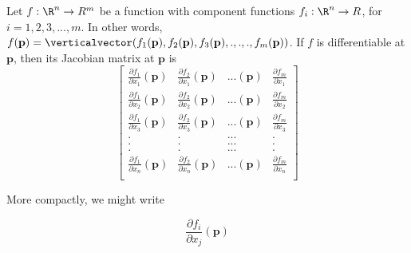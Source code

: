 \documentclass{ximera}
\begin{document}
	\begin{theorem}
		Let $f:\R^n \to R^m$ be a function with component functions $f_i:\R^n \to R$, for $i=1,2,3,...,m$.  In other words,
		$f(\mathbf{p}) = \verticalvector(f_1(\mathbf{p}),f_2(\mathbf{p}),f_3(\mathbf{p}),.,.,., f_m(\mathbf{p}))$.  If $f$ is differentiable at $\mathbf{p}$,
		 then its Jacobian matrix at $\mathbf{p}$ is 
		  \[
		  \begin{bmatrix}
		  \frac{\partial f_1}{\partial x_1} \left(\mathbf{p}\right) & \frac{\partial f_2}{\partial x_1} \left(\mathbf{p}\right) & ...\left(\mathbf{p}\right) & \frac{\partial f_m}{\partial x_1} \\
		  \frac{\partial f_1}{\partial x_2} \left(\mathbf{p}\right) & \frac{\partial f_2}{\partial x_2} \left(\mathbf{p}\right) & ...\left(\mathbf{p}\right) & \frac{\partial f_m}{\partial x_2} \\
		  \frac{\partial f_1}{\partial x_3} \left(\mathbf{p}\right) & \frac{\partial f_2}{\partial x_3} \left(\mathbf{p}\right) & ...\left(\mathbf{p}\right) & \frac{\partial f_m}{\partial x_3} \\
		    .&.&...&.\\
		    .&.&...&.\\
		    .&.&...&.\\
		 \frac{\partial f_1}{\partial x_n} \left(\mathbf{p}\right) & \frac{\partial f_2}{\partial x_n} \left(\mathbf{p}\right) & ...\left(\mathbf{p}\right) & \frac{\partial f_m}{\partial x_n} \\
		  \end{bmatrix}
		  \]
		  
		  More compactly, we might write
		  
		  \[
		  	\frac{\partial f_i}{\partial x_j} \left( \mathbf{p} \right)
		  \]
		  

	\end{theorem}
	
\end{document}
